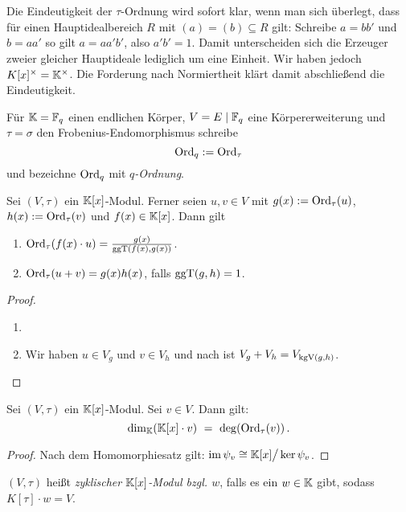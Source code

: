 \begin{bemerkung}
  Die Eindeutigkeit der $\tau$-Ordnung wird sofort klar, wenn man sich
  überlegt, dass für einen Hauptidealbereich $R$ mit $(a) = (b) \subseteq R$ 
  gilt: Schreibe $a = b b'$ und $b = a a'$ so gilt $a = a a'b'$, also 
  $a'b' = 1$. Damit unterscheiden sich die Erzeuger zweier gleicher Hauptideale
  lediglich um eine Einheit. Wir haben jedoch $K[x]^\times = \mathbb{K}^\times$. Die
  Forderung nach Normiertheit klärt damit abschließend die Eindeutigkeit.
\end{bemerkung}


\begin{notation}
  Für $\mathbb{K} = \mathbb{F}_q$ einen endlichen Körper, $V = E \mid \mathbb{F}_q$ eine 
  Körpererweiterung und $\tau = \sigma$ den Frobenius-Endomorphismus schreibe
  \[ \operatorname{Ord}_q := \operatorname{Ord}_\tau \]
  und bezeichne $\operatorname{Ord}_q$ mit \emph{$q$-Ordnung}.
\end{notation}

\begin{lemma}
  \label{lemma:eigenschaften_tau_ordnung}
  Sei $(V,\tau)$ ein $\mathbb{K}[x]$-Modul. Ferner seien
  $u,v\in V$ mit $g(x) := \operatorname{Ord}_\tau(u)$, $h(x) := \operatorname{Ord}_\tau(v)$ und 
  $f(x) \in \mathbb{K}[x]$. Dann gilt
  \begin{enumerate}
    \item $\operatorname{Ord}_\tau(f(x)\cdot u) = \frac{g(x)}{\operatorname{ggT}(f(x),g(x))}$.
    \item $\operatorname{Ord}_\tau(u+v) = g(x)h(x)$, falls $\operatorname{ggT}(g,h) = 1$.
  \end{enumerate}
\end{lemma}
\begin{proof}
  \begin{enumerate}
    \item 
      \TODO
    \item Wir haben $u \in V_g$ und $v \in V_h$ und 
      nach  ist $V_g + V_h = V_{\operatorname{kgV}(g,h)}$.
  \end{enumerate}
\end{proof}

\begin{lemma}
  Sei $(V,\tau)$ ein $\mathbb{K}[x]$-Modul. Sei $v\in V$. Dann gilt:
  \[ \dim_\mathbb{K}( \mathbb{K}[x]\cdot v ) \ =\  \deg( \operatorname{Ord}_\tau(v) )\,.\]
\end{lemma}
\begin{proof}
  Nach dem Homomorphiesatz gilt: 
  $ \operatorname{im}\psi_v \cong \mathbb{K}[x] \big/ \ker \psi_v$.
\end{proof}


\begin{definition}
  $(V,\tau)$ heißt \emph{zyklischer $\mathbb{K}[x]$-Modul bzgl. $w$}, falls es ein 
  $w\in \mathbb{K}$ gibt, sodass $K[\tau]\cdot w = V$.
\end{definition}


